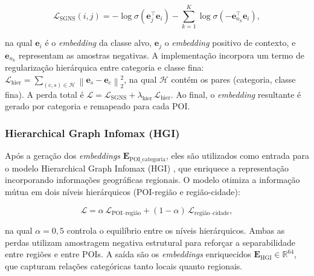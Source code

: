 \[
\mathcal{L}_{\text{SGNS}}(i,j)
=
-\log \sigma\!\left(\mathbf{e}_j^\top \mathbf{e}_i\right)
-
\sum_{k=1}^{K}
\log \sigma\!\left(-\mathbf{e}_{n_k}^\top \mathbf{e}_i\right),
\]

na qual $\mathbf{e}_i$ é o \textit{embedding} da classe alvo, $\mathbf{e}_j$ o \textit{embedding} positivo de contexto, e $\mathbf{e}_{n_k}$ representam as amostras negativas. A implementação incorpora um termo de regularização hierárquica \cite{Xu2023} entre categoria e classe fina: $\mathcal{L}_{\text{hier}} = \sum_{(c,s) \in \mathcal{H}} \left\| \mathbf{e}_s - \mathbf{e}_c \right\|_2^2$, na qual $\mathcal{H}$ contém os pares (categoria, classe fina).
A perda total é $\mathcal{L} = \mathcal{L}_{\text{SGNS}} + \lambda_{\text{hier}} \, \mathcal{L}_{\text{hier}}$. Ao final, o \textit{embedding} resultante é gerado por categoria e remapeado para cada POI.

\subsubsection{Hierarchical Graph Infomax (HGI)}

Após a geração dos \textit{embeddings} $\mathbf{E}_{\text{POI\_categoria}}$, eles são utilizados como entrada para o modelo Hierarchical Graph Infomax (HGI) \cite{huang2023learning}, que enriquece a representação incorporando informações geográficas regionais. O modelo otimiza a informação mútua em dois níveis hierárquicos (POI-região e região-cidade):

\[
\mathcal{L}
=
\alpha\,\mathcal{L}_{\text{POI--região}}
+
(1-\alpha)\,\mathcal{L}_{\text{região--cidade}},
\]

na qual $\alpha = 0{,}5$ controla o equilíbrio entre os níveis hierárquicos. Ambas as perdas utilizam amostragem negativa estrutural para reforçar a separabilidade entre regiões e entre POIs. A saída são os \textit{embeddings} enriquecidos $\mathbf{E}_{\text{HGI}} \in \mathbb{R}^{64}$, que capturam relações categóricas tanto locais quanto regionais.



